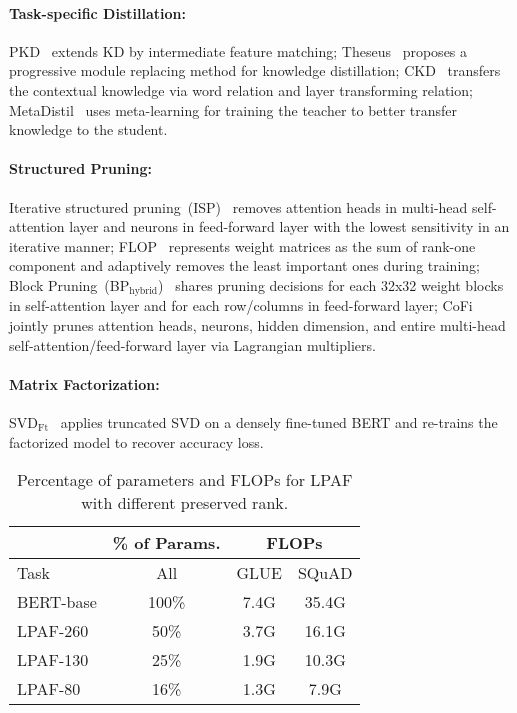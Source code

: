 \paragraph{Task-specific Distillation: }PKD~\cite{pkd} extends KD by intermediate feature matching;
Theseus~\cite{theseus} proposes a progressive module replacing method for knowledge
distillation; CKD~\cite{CKD} transfers the contextual knowledge via word relation and layer transforming relation; MetaDistil~\cite{metadistil} uses meta-learning for training the teacher to better transfer knowledge to the student.

\paragraph{Structured Pruning: } 
Iterative structured pruning~(ISP)~\cite{isp} removes attention heads in multi-head self-attention layer and neurons in feed-forward layer with the lowest sensitivity in an iterative manner; FLOP~\cite{flop} represents weight matrices as the sum of rank-one component and adaptively removes the least important ones during training; Block Pruning~(BP$_{\text{hybrid}}$)~\cite{block} shares pruning decisions for each 32x32 weight blocks in self-attention layer and for each row/columns in feed-forward layer; CoFi~\cite{sp-l0} jointly prunes attention heads, neurons, hidden dimension, and entire multi-head self-attention/feed-forward layer via Lagrangian multipliers.

\paragraph{Matrix Factorization: }SVD$_{\text{Ft}}$~\cite{svd} applies truncated SVD on a densely fine-tuned BERT and re-trains the factorized model to recover accuracy loss.

\begin{table}[t]
	\footnotesize
	\centering
	\begin{tabular}{l|cc|cc}
		\toprule
		& \multicolumn{2}{c|}{\textbf{\% of Params.}} & \multicolumn{2}{c}{\textbf{FLOPs}} \\ 
		\midrule
		Task         & \multicolumn{2}{c|}{All}          & GLUE    & SQuAD    \\ 
		\midrule
		BERT-base    & \multicolumn{2}{c|}{100\%}          & 7.4G      & 35.4G         \\
		\midrule
		LPAF-260     & \multicolumn{2}{c|}{50\%}           & 3.7G      & 16.1G         \\
		LPAF-130     & \multicolumn{2}{c|}{25\%}           & 1.9G      & 10.3G         \\
		LPAF-80      & \multicolumn{2}{c|}{16\%}           & 1.3G      & 7.9G          \\
		\bottomrule
	\end{tabular}
	\caption{Percentage of parameters and FLOPs for LPAF with different preserved rank.}
	\label{table:stats}
\end{table}

